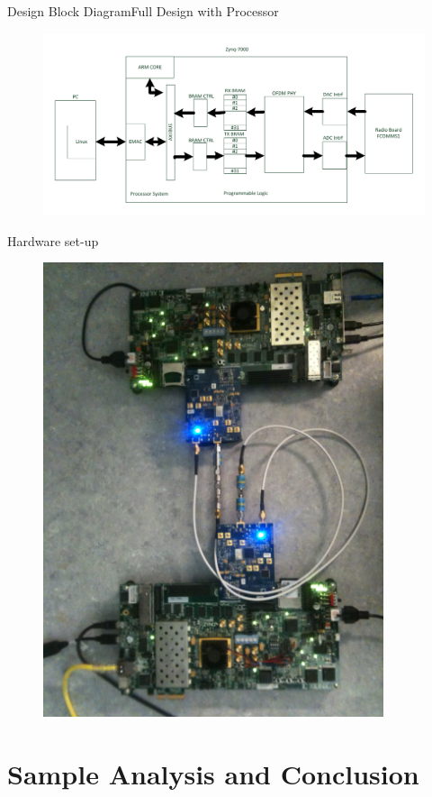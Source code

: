 \documentclass{beamer}
\begin{document}
\begin{frame}{Design Block Diagram}{Full Design with Processor}
\begin{figure}
\centering
\includegraphics[width=\textwidth]{content/fig/sys_block_diagram.pdf}
\end{figure}
\end{frame}

\begin{frame}{Hardware set-up}
\begin{figure}
\centering
\includegraphics[width=10cm]{content/fig/hardware_setup.JPG}
\end{figure}
\end{frame}

\section{Sample Analysis and Conclusion}
\end{document}

